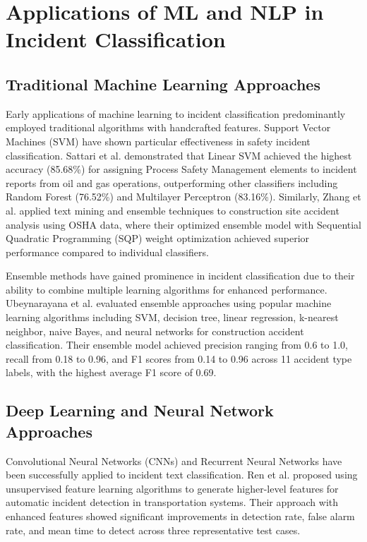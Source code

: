 \documentclass[11pt, titlepage, bibliography=totoc]{scrreprt}
\begin{document}
\section{Applications of ML and NLP in Incident Classification}

\subsection{Traditional Machine Learning Approaches}
Early applications of machine learning to incident classification predominantly employed traditional algorithms with handcrafted features. Support Vector Machines (SVM) have shown particular effectiveness in safety incident classification. Sattari et al. \cite{Sattari2021OilGas} demonstrated that Linear SVM achieved the highest accuracy (85.68\%) for assigning Process Safety Management elements to incident reports from oil and gas operations, outperforming other classifiers including Random Forest (76.52\%) and Multilayer Perceptron (83.16\%). Similarly, Zhang et al. \cite{zhang2019} applied text mining and ensemble techniques to construction site accident analysis using OSHA data, where their optimized ensemble model with Sequential Quadratic Programming (SQP) weight optimization achieved superior performance compared to individual classifiers.

Ensemble methods have gained prominence in incident classification due to their ability to combine multiple learning algorithms for enhanced performance. Ubeynarayana et al. \cite{ubeynarayana2017} evaluated ensemble approaches using popular machine learning algorithms including SVM, decision tree, linear regression, k-nearest neighbor, naive Bayes, and neural networks for construction accident classification. Their ensemble model achieved precision ranging from 0.6 to 1.0, recall from 0.18 to 0.96, and F1 scores from 0.14 to 0.96 across 11 accident type labels, with the highest average F1 score of 0.69.

\subsection{Deep Learning and Neural Network Approaches}
Convolutional Neural Networks (CNNs) and Recurrent Neural Networks have been successfully applied to incident text classification. Ren et al. \cite{ren2013} proposed using unsupervised feature learning algorithms to generate higher-level features for automatic incident detection in transportation systems. Their approach with enhanced features showed significant improvements in detection rate, false alarm rate, and mean time to detect across three representative test cases.
\end{document}
